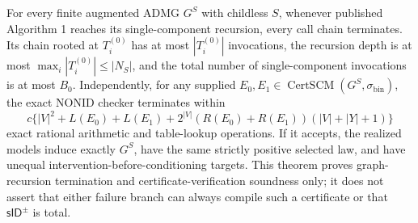 For every finite augmented ADMG \(G^S\) with childless \(S\), whenever published Algorithm 1 reaches its single-component recursion, every call chain terminates. Its chain rooted at \(T_i^{(0)}\) has at most \(|T_i^{(0)}|\) invocations, the recursion depth is at most \(\max_i|T_i^{(0)}|\le|N_S|\), and the total number of single-component invocations is at most \(B_0\). Independently, for any supplied \(E_0,E_1\in\operatorname{CertSCM}(G^S,\sigma_{\mathrm{bin}})\), the exact NONID checker terminates within
\[
 c\{|V|^2+L(E_0)+L(E_1)+2^{|V|}(R(E_0)+R(E_1))(|V|+|Y|+1)\}
\]
exact rational arithmetic and table-lookup operations. If it accepts, the realized models induce exactly \(G^S\), have the same strictly positive selected law, and have unequal intervention-before-conditioning targets. This theorem proves graph-recursion termination and certificate-verification soundness only; it does not assert that either failure branch can always compile such a certificate or that \(\mathsf{sID}^{\pm}\) is total.